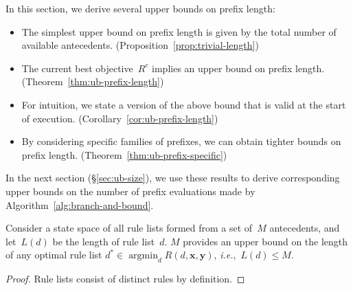 \documentclass[twoside,11pt]{article}
\def\ie{{\it i.e.},~}
\newcommand{\x}{\mathbf{x}}
\newcommand{\y}{\mathbf{y}}
\def\RL{{d}}
\def\Obj{R}
\def\CurrentObj{{R^c}}
\def\OptimalRL{d^*}
\DeclareMathOperator*{\argmin}{argmin}
\begin{document}
\begin{arxiv}
In this section, we derive several upper bounds on prefix length:
\begin{itemize}
\item The simplest upper bound on prefix length is given by the total
number of available antecedents. (Proposition~\ref{prop:trivial-length})
%
\item The current best objective~$\CurrentObj$ implies an upper bound
on prefix length. (Theorem~\ref{thm:ub-prefix-length})
%
\item For intuition, we state a version of the above bound that is valid
at the start of execution. (Corollary~\ref{cor:ub-prefix-length})
%
\item By considering specific families of prefixes,
we can obtain tighter bounds on prefix length. (Theorem~\ref{thm:ub-prefix-specific})
\end{itemize}
In the next section (\S\ref{sec:ub-size}), we use these results
to derive corresponding upper bounds on the number of
prefix evaluations made by Algorithm~\ref{alg:branch-and-bound}.

\begin{proposition}
\label{prop:trivial-length}
Consider a state space of all rule lists formed from
a set of~$M$ antecedents,
and let~$L(\RL)$ be the length of rule list~$\RL$.
%
$M$ provides an upper bound on the length of
any optimal rule list
${\OptimalRL \in \argmin_\RL \Obj(\RL, \x, \y)}$,
\ie ${L(\RL) \le M}$.
\end{proposition}

\begin{proof}
Rule lists consist of distinct rules by definition.
\end{proof}
\end{arxiv}
\end{document}
